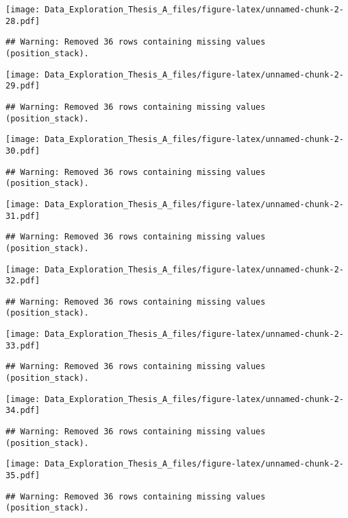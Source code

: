 \documentclass[]{article}
\begin{document}
\texttt{[image: Data\_Exploration\_Thesis\_A\_files/figure-latex/unnamed-chunk-2-28.pdf]}

\begin{verbatim}
## Warning: Removed 36 rows containing missing values (position_stack).
\end{verbatim}

\texttt{[image: Data\_Exploration\_Thesis\_A\_files/figure-latex/unnamed-chunk-2-29.pdf]}

\begin{verbatim}
## Warning: Removed 36 rows containing missing values (position_stack).
\end{verbatim}

\texttt{[image: Data\_Exploration\_Thesis\_A\_files/figure-latex/unnamed-chunk-2-30.pdf]}

\begin{verbatim}
## Warning: Removed 36 rows containing missing values (position_stack).
\end{verbatim}

\texttt{[image: Data\_Exploration\_Thesis\_A\_files/figure-latex/unnamed-chunk-2-31.pdf]}

\begin{verbatim}
## Warning: Removed 36 rows containing missing values (position_stack).
\end{verbatim}

\texttt{[image: Data\_Exploration\_Thesis\_A\_files/figure-latex/unnamed-chunk-2-32.pdf]}

\begin{verbatim}
## Warning: Removed 36 rows containing missing values (position_stack).
\end{verbatim}

\texttt{[image: Data\_Exploration\_Thesis\_A\_files/figure-latex/unnamed-chunk-2-33.pdf]}

\begin{verbatim}
## Warning: Removed 36 rows containing missing values (position_stack).
\end{verbatim}

\texttt{[image: Data\_Exploration\_Thesis\_A\_files/figure-latex/unnamed-chunk-2-34.pdf]}

\begin{verbatim}
## Warning: Removed 36 rows containing missing values (position_stack).
\end{verbatim}

\texttt{[image: Data\_Exploration\_Thesis\_A\_files/figure-latex/unnamed-chunk-2-35.pdf]}

\begin{verbatim}
## Warning: Removed 36 rows containing missing values (position_stack).
\end{verbatim}
\end{document}
